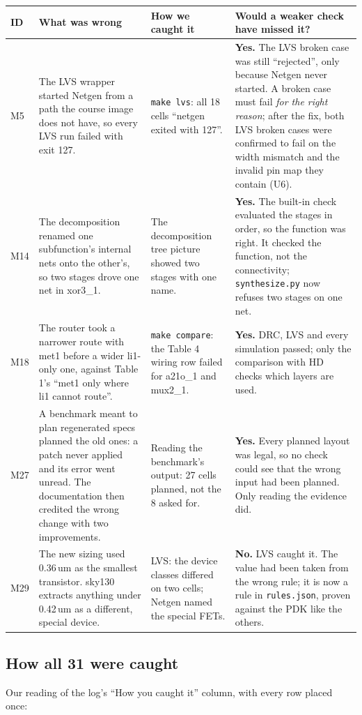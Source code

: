 \documentclass[10pt,a4paper]{article}
\newcommand{\code}[1]{\texttt{#1}}
\begin{document}
{\small
\begin{longtable}{@{}L{9mm}L{53mm}L{38mm}L{59mm}@{}}
\toprule
\textbf{ID} & \textbf{What was wrong} & \textbf{How we caught it} & \textbf{Would a weaker check have missed it?}\\
\midrule\endhead
M5 & The LVS wrapper started Netgen from a path the course image does not have, so every LVS run failed with exit 127. & \code{make lvs}: all 18 cells ``netgen exited with 127''. & \textbf{Yes.} The LVS broken case was still ``rejected'', only because Netgen never started. A broken case must fail \emph{for the right reason}; after the fix, both LVS broken cases were confirmed to fail on the width mismatch and the invalid pin map they contain (U6).\\
M14 & The decomposition renamed one subfunction's internal nets onto the other's, so two stages drove one net in xor3\_1. & The decomposition tree picture showed two stages with one name. & \textbf{Yes.} The built-in check evaluated the stages in order, so the function was right. It checked the function, not the connectivity; \code{synthesize.py} now refuses two stages on one net.\\
M18 & The router took a narrower route with met1 before a wider li1-only one, against Table 1's ``met1 only where li1 cannot route''. & \code{make compare}: the Table 4 wiring row failed for a21o\_1 and mux2\_1. & \textbf{Yes.} DRC, LVS and every simulation passed; only the comparison with HD checks which layers are used.\\
M27 & A benchmark meant to plan regenerated specs planned the old ones: a patch never applied and its error went unread. The documentation then credited the wrong change with two improvements. & Reading the benchmark's output: 27 cells planned, not the 8 asked for. & \textbf{Yes.} Every planned layout was legal, so no check could see that the wrong input had been planned. Only reading the evidence did.\\
M29 & The new sizing used 0.36\,um as the smallest transistor. sky130 extracts anything under 0.42\,um as a different, special device. & LVS: the device classes differed on two cells; Netgen named the special FETs. & \textbf{No.} LVS caught it. The value had been taken from the wrong rule; it is now a rule in \code{rules.json}, proven against the PDK like the others.\\
\bottomrule
\end{longtable}}

\subsection{How all 31 were caught}
Our reading of the log's ``How you caught it'' column, with every row placed once:
\end{document}
